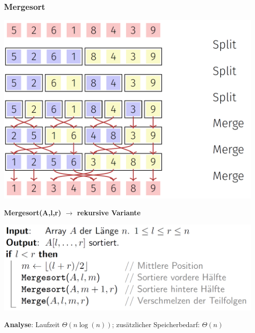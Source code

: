\begin{sectionbox}
\subsubsection{Mergesort}
\begin{center}
    \includegraphics[width = 0.5\columnwidth]{../img/Mergesort.png}
\end{center}\smallskip
\textbf{Mergesort(A,l,r) $\rightarrow$ rekursive Variante}\par
\includegraphics[width = 0.75\columnwidth]{../img/MergesortCode.png}
\par\smallskip
\textbf{Analyse}: Laufzeit  $\Theta(n \operatorname{log}(n))$; zusätzlicher Speicherbedarf: $\Theta(n)$
\end{sectionbox}
\vspace{-4pt}

